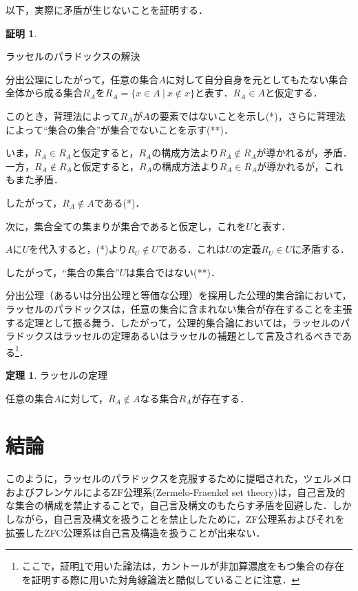 \documentclass[10pt, a5paper, twoside]{jsarticle}
\theoremstyle{definition}
\newtheorem{thm}{定理}
\newtheorem{prf}{証明}
\begin{document}
			以下，実際に矛盾が生じないことを証明する．

			\begin{prf}\label{sol}
				
				ラッセルのパラドックスの解決

				分出公理にしたがって，任意の集合$A$に対して自分自身を元としてもたない集合全体から成る集合$R_A$を$ R_A = \{ x \in A \ |\  x \notin x \} $と表す．$R_A \in A$と仮定する．

				このとき，背理法によって$R_A$が$A$の要素ではないことを示し(*)，さらに背理法によって“集合の集合”が集合でないことを示す(**)．

				いま，$R_A \in R_A$と仮定すると，$R_A$の構成方法より$R_A \notin R_A$が導かれるが，矛盾．一方，$R_A \notin R_A$と仮定すると，$R_A$の構成方法より$R_A \in R_A$が導かれるが，これもまた矛盾．

				したがって，$R_A \notin A$である(*)．

				次に，集合全ての集まりが集合であると仮定し，これを$U$と表す．

				$A$に$U$を代入すると，(*)より$R_U \notin U$である．これは$U$の定義$R_U \in U$に矛盾する．

				したがって，“集合の集合”$U$は集合ではない(**)．

			\end{prf}

			分出公理（あるいは分出公理と等価な公理）を採用した公理的集合論において，ラッセルのパラドックスは，任意の集合に含まれない集合が存在することを主張する定理として振る舞う．したがって，公理的集合論においては，ラッセルのパラドックスはラッセルの定理あるいはラッセルの補題として言及されるべきである\footnote{ここで，証明\ref{sol}で用いた論法は，カントールが非加算濃度をもつ集合の存在を証明する際に用いた対角線論法と酷似していることに注意．}．

			\begin{thm}
				
				ラッセルの定理

				任意の集合$A$に対して，$R_A \notin A$なる集合$R_A$が存在する．

			\end{thm}

	\section{結論}

		このように，ラッセルのパラドックスを克服するために提唱された，ツェルメロおよびフレンケルによるZF公理系(Zermelo-Fraenkel set theory)は，自己言及的な集合の構成を禁止することで，自己言及構文のもたらす矛盾を回避した．しかしながら，自己言及構文を扱うことを禁止したために，ZF公理系およびそれを拡張したZFC公理系は自己言及構造を扱うことが出来ない\cite{ytb}．
\end{document}
